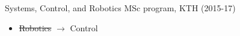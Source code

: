 \begin{frame}{Systems, Control, and Robotics MSc program, KTH (2015-17)}

  \begin{itemize}
    \item \sout{Robotics} $\rightarrow$ Control
  \end{itemize}

\end{frame}
